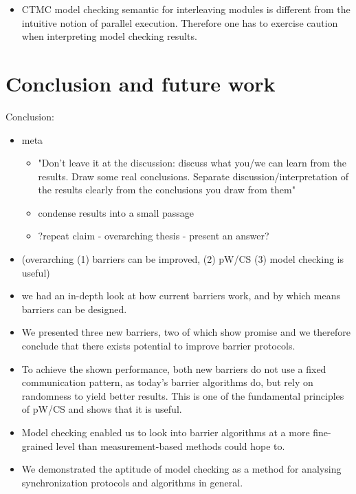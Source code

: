 \documentclass[a4paper, 10pt]{article}
\begin{document}
\begin{itemize}
	\item CTMC model checking semantic for interleaving modules is different from the intuitive notion of parallel execution. Therefore one has to exercise caution when interpreting model checking results.
\end{itemize}

\section{Conclusion and future work}
\label{sec:conclusion}
Conclusion:
\begin{itemize}
	\item meta
		\begin{itemize}
			\item "Don't leave it at the discussion: discuss what you/we can learn from the results. Draw some real conclusions. Separate discussion/interpretation of the results clearly from the conclusions you draw from them"
			\item condense results into a small passage
			\item ?repeat claim - overarching thesis - present an answer?
		\end{itemize}
	\item (overarching (1) barriers can be improved, (2) pW/CS (3) model checking is useful)
	\item we had an in-depth look at how current barriers work, and by which means barriers can be designed.
	\item We presented three new barriers, two of which show promise and we therefore conclude that there exists potential to improve barrier protocols.
	\item To achieve the shown performance, both new barriers do not use a fixed communication pattern, as today's barrier algorithms do, but rely on randomness to yield better results. This is one of the fundamental principles of pW/CS and shows that it is useful.
	\item Model checking enabled us to look into barrier algorithms at a more fine-grained level than measurement-based methods could hope to.
	\item We demonstrated the aptitude of model checking as a method for analysing synchronization protocols and algorithms in general.
\end{itemize}
\end{document}
